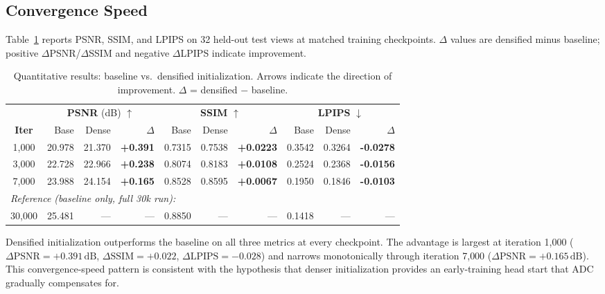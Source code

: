 \documentclass[12pt, a4paper]{article}
\begin{document}
\subsection{Convergence Speed}
\label{sec:convergence}

Table~\ref{tab:results} reports PSNR, SSIM, and LPIPS on 32 held-out test views at
matched training checkpoints. $\Delta$ values are densified minus baseline; positive
$\Delta$PSNR/$\Delta$SSIM and negative $\Delta$LPIPS indicate improvement.

\begin{table}[h]
\centering
\caption{Quantitative results: baseline vs.\ densified initialization.
Arrows indicate the direction of improvement.
$\Delta$ = densified $-$ baseline.}
\label{tab:results}
\begin{tabular}{c
    r
    r
    r
    r
    r
    r
    r
    r
    r}
\toprule
& \multicolumn{3}{c}{\textbf{PSNR} (dB) $\uparrow$}
& \multicolumn{3}{c}{\textbf{SSIM} $\uparrow$}
& \multicolumn{3}{c}{\textbf{LPIPS} $\downarrow$} \\
\cmidrule(lr){2-4}\cmidrule(lr){5-7}\cmidrule(lr){8-10}
\textbf{Iter} & {Base} & {Dense} & {$\Delta$}
              & {Base} & {Dense} & {$\Delta$}
              & {Base} & {Dense} & {$\Delta$} \\
\midrule
1{,}000 & 20.978 & 21.370 & \bfseries +0.391
        & 0.7315 & 0.7538 & \bfseries +0.0223
        & 0.3542 & 0.3264 & \bfseries -0.0278 \\
3{,}000 & 22.728 & 22.966 & \bfseries +0.238
        & 0.8074 & 0.8183 & \bfseries +0.0108
        & 0.2524 & 0.2368 & \bfseries -0.0156 \\
7{,}000 & 23.988 & 24.154 & \bfseries +0.165
        & 0.8528 & 0.8595 & \bfseries +0.0067
        & 0.1950 & 0.1846 & \bfseries -0.0103 \\
\midrule
\multicolumn{10}{l}{\textit{Reference (baseline only, full 30k run):}} \\
30{,}000 & 25.481 & {---} & {---}
         & 0.8850 & {---} & {---}
         & 0.1418 & {---} & {---} \\
\bottomrule
\end{tabular}
\end{table}

Densified initialization outperforms the baseline on all three metrics at every
checkpoint. The advantage is largest at iteration 1{,}000 ($\Delta\text{PSNR} =
+0.391\,\text{dB}$, $\Delta\text{SSIM} = +0.022$, $\Delta\text{LPIPS} = -0.028$)
and narrows monotonically through iteration 7{,}000 ($\Delta\text{PSNR} =
+0.165\,\text{dB}$). This convergence-speed pattern is consistent with the
hypothesis that denser initialization provides an early-training head start that
ADC gradually compensates for.
\end{document}
